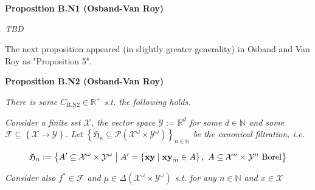 \documentclass[a4paper]{article}
\newcommand{\Co}[1]{}
\DeclareMathOperator{\Supp}{supp}
\newcommand{\AP}[1]{\left(#1\right)}
\newcommand{\AC}[1]{\left\{#1\right\}}
\newcommand{\ACM}[2]{\left\{#1\;\middle\vert\;#2\right\}}
\newcommand{\E}[1]{\underset{#1}{\operatorname{E}}}
\newcommand{\PS}[1]{\mathcal{P}\AP{#1}}
\newcommand{\D}{\mathrm{d}}
\newcommand{\Nats}{\mathbb{N}}
\newcommand{\Reals}{\mathbb{R}}
\newcommand{\Abs}[1]{\left\vert #1 \right\vert}
\newcommand{\K}{\xrightarrow{\mathrm{k}}}
\newcommand{\X}{\mathcal{X}}
\newcommand{\Y}{\mathcal{Y}}
\newcommand{\F}{\mathcal{F}}
\newcommand{\A}{\mathcal{A}}
\newcommand{\V}{\mathrm{V}}
\newcommand{\EU}{\mathrm{EU}}
\begin{document}
\textbf{Proposition B.N1 (Osband-Van Roy)}\Co{b}

\textit{TBD}\Co{i}

\Co{...

\textbf{Proposition B.N3}\Co{b}

Consider some $\gamma\in(0,1)$, $\tau\in(0,\infty)$, $T\in\Nats^+$, a universe..., some $\pi^*: ? \rightarrow \A$ and some $\pi^0: ? \K \A$. Assume that $\gamma \geq \gamma_M$. For any $n \in \Nats$, let $\pi^*_n$ be a policy s.t. for any $h \in ?$

$$\pi^*_n(h):=\begin{cases} \pi^0(h) \text{ if } \Abs{h} < nT \\ \pi^*(h) \text{ otherwise} \end{cases}$$

Assume that for any $h \in ?$

i. $$\pi^*(s) \in \A_{M}^\omega\AP{S(h)}$$

ii. $$\Supp{\pi^0(h)} \subseteq \A_{M}^0\AP{S(h)}$$

iii. For any $\theta\in(\gamma,1)$ $$\Abs{\frac{\D\V_{M}\AP{S(h),\theta}}{\D\theta}} \leq \tau$$

Then

$$\EU^{*}_\upsilon(\gamma)-\EU^{\pi^0}_\upsilon(\gamma) \leq (1-\gamma)\sum_{n=0}^\infty \sum_{m=0}^{T-1} \gamma^{nT+m}\left(\E{x\sim\mu\bowtie\pi^*_n}\left[r\left(x_{:nT+m}\right)\right]-\E{x\sim\mu\bowtie\pi^0}\left[r\left(x_{:nT+m}\right)\right]\right) + \frac{2\tau\gamma^T(1-\gamma)}{1-\gamma^T}$$}

The next proposition appeared (in slightly greater generality) in Osband and Van Roy as "Proposition 5".

\textbf{Proposition B.N2 (Osband-Van Roy)}\Co{b}

\textit{There is some $C_{\mathrm{B.N2}}\in\Reals^+$ s.t. the following holds.}\Co{i}

\textit{Consider a finite set $\X$, the vector space $\Y:=\Reals^d$ for some $d\in\Nats$ and some $\F\subseteq\AC{\X\rightarrow\Y}$. Let $\AC{\mathfrak{H}_n\subseteq\PS{\X^\omega\times\Y^\omega}}_{n\in\Nats}$ be the canonical filtration, i.e.}\Co{i}

$$\mathfrak{H}_n:=\ACM{A'\subseteq\X^\omega\times\Y^\omega}{A'=\ACM{\bold{xy}}{\bold{xy}_{:n}\in A},\ A\subseteq\X^n\times\Y^n\text{ Borel}}$$

\textit{Consider also $f^*\in\F$ and $\mu\in\Delta\AP{\X^\omega\times\Y^\omega}$ s.t. for any $n\in\Nats$ and $x\in\X$}\Co{i}
\end{document}

